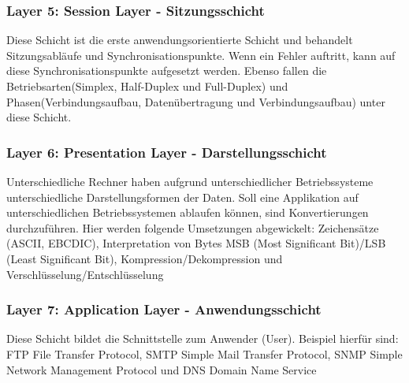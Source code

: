 \documentclass[12pt,a4paper]{article}
\begin{document}
			\subsubsection{Layer 5: Session Layer - Sitzungsschicht}
				Diese Schicht ist die erste anwendungsorientierte Schicht und behandelt Sitzungsabläufe und Synchronisationspunkte. Wenn ein Fehler auftritt, kann auf diese Synchronisationspunkte aufgesetzt werden. Ebenso fallen die Betriebsarten(Simplex, Half-Duplex und Full-Duplex) und Phasen(Verbindungsaufbau, Datenübertragung und Verbindungsaufbau) unter diese Schicht.

			\subsubsection{Layer 6: Presentation Layer - Darstellungsschicht}
				Unterschiedliche Rechner haben aufgrund unterschiedlicher Betriebssysteme unterschiedliche Darstellungsformen der Daten. Soll eine Applikation auf unterschiedlichen Betriebssystemen ablaufen können, sind Konvertierungen durchzuführen.
				Hier werden folgende Umsetzungen abgewickelt:\newline
				Zeichensätze (ASCII, EBCDIC), Interpretation von Bytes MSB (Most Significant Bit)/LSB (Least Significant Bit), Kompression/Dekompression und Verschlüsselung/Entschlüsselung

			\subsubsection{Layer 7: Application Layer - Anwendungsschicht}
			Diese Schicht bildet die Schnittstelle zum Anwender (User). Beispiel hierfür sind:\newline
			FTP File Transfer Protocol, SMTP Simple Mail Transfer Protocol, SNMP Simple Network Management Protocol und DNS Domain Name Service
	
			\newpage
\end{document}
